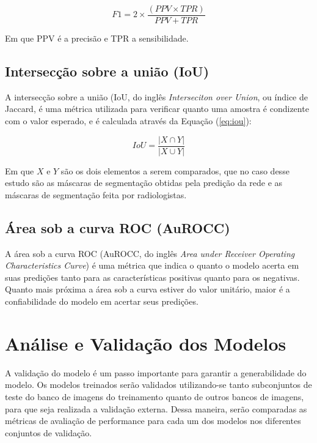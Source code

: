 \begin{equation}\label{eq:f1score}
    F1 = 2 \times \frac{(PPV \times TPR)}{PPV+TPR}
\end{equation}

Em que PPV é a precisão e TPR a sensibilidade.

\subsection{Intersecção sobre a união (IoU)}

A intersecção sobre a união (IoU, do inglês \textit{Interseciton over Union}, ou índice de Jaccard, é uma métrica utilizada para verificar quanto uma amostra é condizente com o valor esperado, e é calculada através da Equação (\ref{eq:iou}):

\begin{equation}\label{eq:iou}
    IoU = \frac{\left|X \cap Y\right|}{\left|  X \cup Y \right|}
\end{equation}

Em que $X$ e $Y$ são os dois elementos a serem comparados, que no caso desse estudo são as máscaras de segmentação obtidas pela predição da rede e as máscaras de segmentação feita por radiologistas.

\subsection{Área sob a curva ROC (AuROCC)}

A área sob a curva ROC (AuROCC, do inglês \textit{Area under Receiver Operating Characteristics Curve}) é uma métrica que indica o quanto o modelo acerta em suas predições tanto para as características positivas quanto para os negativas. Quanto mais próxima a área sob a curva estiver do valor unitário, maior é a confiabilidade do modelo em acertar seus predições.

\section{Análise e Validação dos Modelos}

A validação do modelo é um passo importante para garantir a generabilidade do modelo. Os modelos treinados serão validados utilizando-se tanto subconjuntos de teste do banco de imagens do treinamento quanto de outros bancos de imagens, para que seja realizada a validação externa. Dessa maneira, serão comparadas as métricas de avaliação de performance para cada um dos modelos nos diferentes conjuntos de validação.

